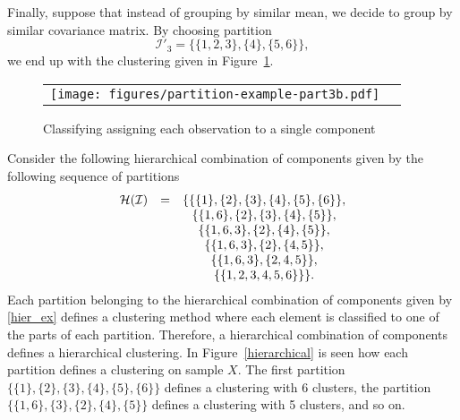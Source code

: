 \documentclass[10pt, a4paper]{article}
\begin{document}
Finally, suppose that instead of grouping by similar mean, we decide to group by similar covariance matrix. By choosing partition
\[\mathcal{I}'_3 = \{\{1, 2, 3\},\{4\},\{5, 6\}\},\]
we end up with the clustering given in Figure~\ref{ex_part3b}.

\begin{figure}[!h]
\begin{center}
\begin{tabular}{cc}
  \texttt{[image: figures/partition-example-part3b.pdf]} \\
 \end{tabular}
 \caption{Classifying assigning each observation to a single component}\label{ex_part3b}
\end{center}
\end{figure}

Consider the following hierarchical combination of components given by the following sequence of partitions
\begin{equation}
\begin{array}{r c c}
\mathcal{H}(\mathcal{I}) &=& \{ \{\{1\},\{2\},\{3\},\{4\},\{5\},\{6\}\}, \\
   & & \{\{1, 6\},\{2\},\{3\},\{4\},\{5\} \}, \\
   & &    \{\{1, 6, 3\},\{2\},\{4\},\{5\} \}, \\
   & &    \{\{1, 6, 3\},\{2\},\{4, 5\} \}, \\
    & &   \{\{1, 6, 3\},\{2, 4, 5\} \}, \\
   & &    \{\{1, 2, 3, 4, 5, 6\}\} \}.
\end{array}
\label{hier_ex}
\end{equation}
Each partition belonging to the hierarchical combination of components given by \ref{hier_ex} defines a clustering method where each element is classified to one of the parts of each partition. Therefore, a hierarchical combination of components defines a hierarchical clustering. In Figure~\ref{hierarchical} is seen how each partition defines a clustering on sample $X$. The first partition $\{\{1\},\{2\},\{3\},\{4\},\{5\},\{6\}\}$ defines a clustering with 6 clusters, the partition $\{\{1, 6\}, \{3\},\{2\},\{4\},\{5\} \}$ defines a clustering with 5 clusters, and so on.
\end{document}
